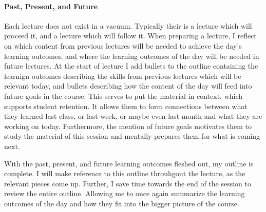\documentclass{article}
\begin{document}
\paragraph{Past, Present, and Future} Each lecture does not exist in a vacuum. Typically their is a lecture which will proceed it, and  a lecture which will follow it. When preparing a lecture, I reflect on which content from previous lectures will be needed to achieve the day's learning outcomes, and where the learning outcomes of the day will be needed in future lectures. At the start of lecture I add bullets to the outline containing the learnign outcomes describing the skills from previous lectures which will be relevant today, and bullets describing how the content of the day will feed into future goals in the course. This serves to put the material in context, which supports student retention. It allows them to form connections between what they learned last class, or last week, or maybe even last month and what they are working on today. Furthermore, the mention of future goals motivates them to study the material of this session and mentally prepares them for what is coming next. 

With the past, present, and future learning outcomes fleshed out, my outline is complete. I will make reference to this outline throuhgout the lecture, as the relevant pieces come up. Further, I save time towards the end of the session to review the entire outline. Allowing me to once again summarize the learning outcomes of the day and how they fit into the bigger picture of the course.
\end{document}
